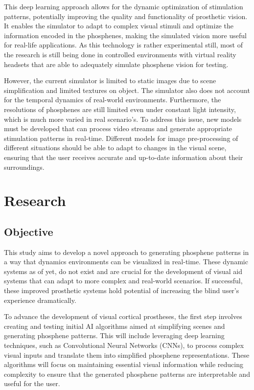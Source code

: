 \documentclass[10pt]{article}
\begin{document}
This deep learning approach allows for the dynamic optimization of stimulation
patterns, potentially improving the quality and functionality of prosthetic
vision. It enables the simulator to adapt to complex visual stimuli and optimize
the information encoded in the phosphenes, making the simulated vision more
useful for real-life applications. As this technology is rather experimental
still, most of the research is still being done in controlled environments with
virtual reality headsets that are able to adequately simulate phosphene vision
for testing.

However, the current simulator is limited to static images due to scene
simplification and limited textures on object. The simulator also does not account for the temporal dynamics of real-world
environments. Furthermore, the resolutions of phosphenes are still limited even
under constant light intensity, which is much more varied in real scenario's. To
address this issue, new models must be developed that can process video streams
and generate appropriate stimulation patterns in real-time. Different models for
image pre-processing of different situations should be able to adapt to changes
in the visual scene, ensuring that the user receives accurate and up-to-date
information about their surroundings.

\section*{Research}\label{sec:research}
\subsection*{Objective}\label{subsec:objective}
This study aims to develop a novel approach to generating phosphene patterns in
a way that dynamics environments can be visualized in real-time. These dynamic
systems as of yet, do not exist and are crucial for the development of visual
aid systems that can adapt to more complex and real-world scenarios. If
successful, these improved prosthetic systems hold potential of increasing the
blind user's experience dramatically.

To advance the development of visual cortical prostheses, the first step
involves creating and testing initial AI algorithms aimed at simplifying scenes
and generating phosphene patterns. This will include leveraging deep learning
techniques, such as Convolutional Neural Networks (CNNs), to process complex
visual inputs and translate them into simplified phosphene representations.
These algorithms will focus on maintaining essential visual information while
reducing complexity to ensure that the generated phosphene patterns are
interpretable and useful for the user.
\end{document}
